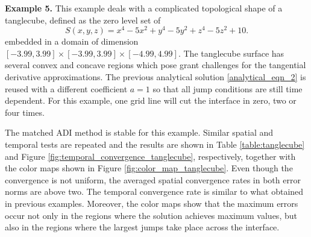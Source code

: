 \documentclass[dissertation]{uathesis}
\begin{document}
\begin{body}
\begin{flushleft}


{\flushleft \bf Example 5.} This example deals with a complicated topological shape of a tanglecube, defined as the zero level set of 
%
\begin{equation} \label{tanglecube}
S(x,y,z) = x^{4}-5x^{2}+y^{4}-5y^{2}+z^{4}-5z^{2}+10. 
\end{equation}
%
embedded in a domain of dimension $[-3.99,3.99]\times[-3.99,3.99]\times[-4.99,4.99]$. The tanglecube surface has several convex and concave regions which pose grant challenges for the tangential derivative approximations. The previous analytical solution \eqref{analytical_eqn_2} is reused with a different coefficient $a=1$ so that all jump conditions are still time dependent. For this example, one grid line will cut the interface in zero, two or four times. 

\hspace{1cm} The matched ADI method is stable for this example. 
Similar spatial and temporal tests are repeated and the results are shown in Table \ref{table:tanglecube} and Figure \ref{fig:temporal_convergence_tanglecube}, respectively, together with the color maps shown in Figure \ref{fig:color_map_tanglecube}. Even though the convergence is not uniform, the averaged spatial convergence rates in both error norms are above two. The temporal convergence rate is similar to what obtained in previous examples. 
Moreover, the color maps show that the maximum errors occur not only in the regions where the solution achieves maximum values, but also in the regions where the largest jumps take place across the interface.


\end{flushleft}
\end{body}
\end{document}
